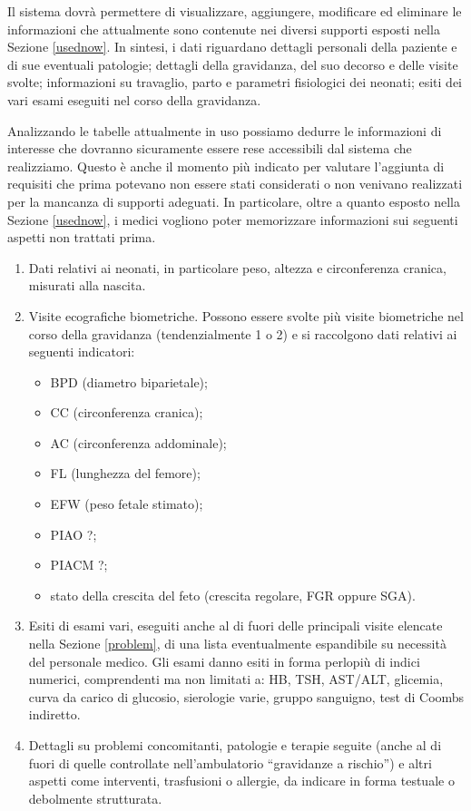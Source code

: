 Il sistema dovrà permettere di visualizzare, aggiungere, modificare ed eliminare le informazioni che attualmente sono contenute nei diversi supporti esposti nella Sezione \ref{usednow}.
In sintesi, i dati riguardano dettagli personali della paziente e di sue eventuali patologie; dettagli della gravidanza, del suo decorso e delle visite svolte; informazioni su travaglio, parto e parametri fisiologici dei neonati; esiti dei vari esami eseguiti nel corso della gravidanza.

Analizzando le tabelle attualmente in uso possiamo dedurre le informazioni di interesse che dovranno sicuramente essere rese accessibili dal sistema che realizziamo.
Questo è anche il momento più indicato per valutare l'aggiunta di requisiti che prima potevano non essere stati considerati o non venivano realizzati per la mancanza di supporti adeguati.
In particolare, oltre a quanto esposto nella Sezione \ref{usednow}, i medici vogliono poter memorizzare informazioni sui seguenti aspetti non trattati prima.
\begin{enumerate}
\item Dati relativi ai neonati, in particolare peso, altezza e circonferenza cranica, misurati alla nascita.
\item Visite ecografiche biometriche. Possono essere svolte più visite biometriche nel corso della gravidanza (tendenzialmente 1 o 2) e si raccolgono dati relativi ai seguenti indicatori:
    \begin{itemize}
    \item BPD (diametro biparietale);
    \item CC (circonferenza cranica);
    \item AC (circonferenza addominale);
    \item FL (lunghezza del femore);
    \item EFW (peso fetale stimato);
    \item PIAO ?;
    \item PIACM ?;
    \item stato della crescita del feto (crescita regolare, FGR oppure SGA).
    \end{itemize}
\item Esiti di esami vari, eseguiti anche al di fuori delle principali visite elencate nella Sezione \ref{problem}, di una lista eventualmente espandibile su necessità del personale medico. Gli esami danno esiti in forma perlopiù di indici numerici, comprendenti ma non limitati a: HB, TSH, AST/ALT, glicemia, curva da carico di glucosio, sierologie varie, gruppo sanguigno, test di Coombs indiretto.
\item Dettagli su problemi concomitanti, patologie e terapie seguite (anche al di fuori di quelle controllate nell'ambulatorio \enquote{gravidanze a rischio}) e altri aspetti come interventi, trasfusioni o allergie, da indicare in forma testuale o debolmente strutturata.
\end{enumerate}

